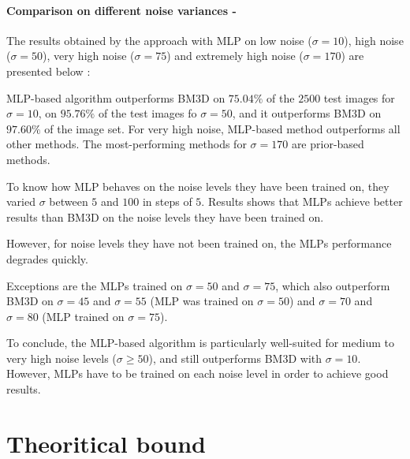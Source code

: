 \documentclass[10pt,a4paper]{article}
\newcommand{\svs}{\vspace{9pt}}
\newcommand{\ourparagraph}[1]{\paragraph{#1}}
\begin{document}
\ourparagraph{Comparison on different noise variances -}{
The results obtained by the approach with MLP on low noise ($\sigma = 10$), high noise ($\sigma = 50$),
very high noise ($\sigma = 75$) and extremely high noise ($\sigma = 170$) are presented below :

\svs

MLP-based algorithm outperforms BM3D on $75.04\%$ of the $2500$ test images for $\sigma=10$, on $95.76\%$ of the test images fo $\sigma=50$, and it outperforms BM3D on $97.60\%$ of the image set. For very high noise, MLP-based method outperforms all other methods. The most-performing methods for $\sigma=170$ are prior-based methods.

\svs 

To know how MLP behaves on the noise levels they have been trained on, they varied $\sigma$ between $5$ and $100$ in steps of $5$.
Results shows that MLPs achieve better results than BM3D on the noise levels they have been trained on.

\svs
However, for noise levels they have not been
trained on, the MLPs performance degrades quickly.

Exceptions are the MLPs trained on $\sigma = 50$ and $\sigma = 75$, which also outperform BM3D on $\sigma = 45$ and $\sigma = 55$ (MLP was trained on $\sigma = 50$) and $\sigma = 70$ and $\sigma = 80$ (MLP trained on $\sigma = 75$).

\svs

To conclude, the MLP-based algorithm is particularly well-suited for medium to very high noise
levels ($\sigma \geq 50$), and still outperforms BM3D with
$\sigma = 10$. However, MLPs have to be trained on each noise level in order to achieve good results.}

\section{Theoritical bound}
\end{document}
